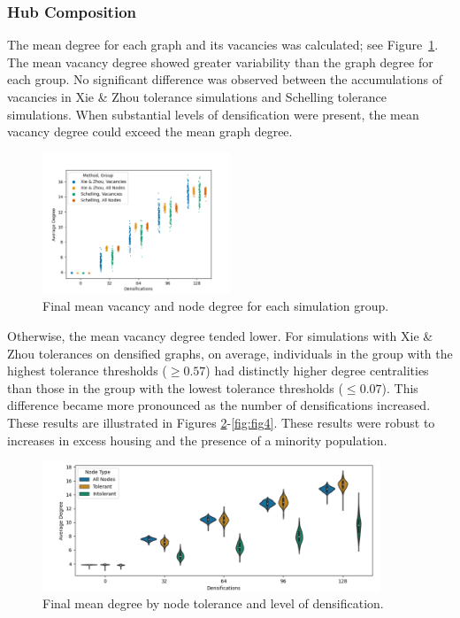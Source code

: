 \documentclass[a4paper]{article}
\begin{document}
\subsubsection{Hub Composition}
The mean degree for each graph and its vacancies was calculated; see Figure~\ref*{fig:fig2}. The mean vacancy degree showed greater variability than the graph degree for each group.  No significant difference was observed between the accumulations of vacancies in Xie \& Zhou tolerance simulations and Schelling tolerance simulations.  When substantial levels of densification were present, the mean vacancy degree could exceed the mean graph degree. 
\begin{figure}[H]
    \centering
    \includegraphics[width=0.5\textwidth]{fig2.png}
    \caption{Final mean vacancy and node degree for each simulation group.}
    \label{fig:fig2}
\end{figure}
Otherwise, the mean vacancy degree tended lower.  For simulations with Xie \& Zhou tolerances on densified graphs, on average, individuals in the group with the highest tolerance thresholds ($\geq0.57$) had distinctly higher degree centralities than those in the group with the lowest tolerance thresholds ($\le0.07$). This difference became more pronounced as the number of densifications increased. These results are illustrated in Figures \ref*{fig:fig3}-\ref*{fig:fig4}. These results were robust to increases in excess housing and the presence of a minority population.

\begin{figure}[H]
    \centering
    \includegraphics[width=0.9\textwidth]{fig3.png}
    \caption{Final mean degree by node tolerance and level of densification.}
    \label{fig:fig3}
\end{figure}
\end{document}
